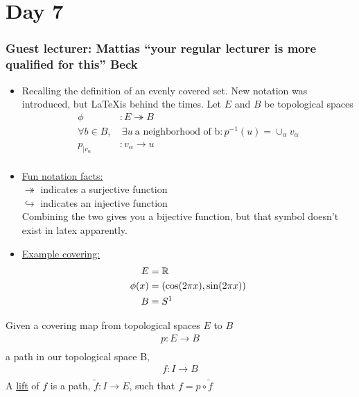 \documentclass[../notes.tex]{subfiles}
\begin{document}
\section{Day 7}
    \subsubsection{Guest lecturer: Mattias ``your regular lecturer is more qualified for this'' Beck}
    \begin{itemize}
        \item Recalling the definition of an evenly covered set. New notation was introduced, but
            \LaTeX is behind the times.
            Let $E$ and $B$ be topological spaces
            \begin{align*}
                \phi&:E \twoheadrightarrow B\\
                \forall b \in B,&\ \exists u\ \text{a neighborhood of b}: p^{-1}(u)=\cup_{\alpha}v_\alpha\\
                p_{|v_{\alpha}}&: v_{\alpha}\rightarrow u\\
            \end{align*}
        \item \underline{Fun notation facts:}\\
            $\twoheadrightarrow$ indicates a surjective function\\
            $\hookrightarrow$ indicates an injective function\\
            Combining the two gives you a bijective function, but that symbol doesn't exist
            in latex apparently.
        \item \underline{Example covering:}
            \begin{align*}
                E&=\mathbb{R}\\
                \phi(x)&=(\cos(2\pi x), \sin(2\pi x))\\
                B&=S^{1}\\
            \end{align*}
    \end{itemize}
            \begin{definition} Given a covering map from topological
                spaces $E$ to $B$
                \begin{align*}
                    p: E\rightarrow B\\
                \end{align*}
                    a path in our topological space B,
                \begin{align*}
                    f: I \rightarrow B\\
                \end{align*}
                A \underline{lift} of $f$ is a path, $\tilde{f}: I\rightarrow E$, such that
                $f=p\circ \tilde{f}$
            \end{definition}
\end{document}
